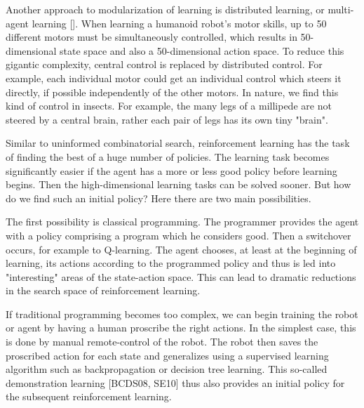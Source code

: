 \documentclass[10pt]{book}
\begin{document}
Another approach to modularization of learning is distributed learning, or multi-agent learning [\cite{panait2005cooperative}]. When learning a humanoid robot's motor skills, up to 50 different motors must be simultaneously controlled, which results in 50-dimensional state space and also a 50-dimensional action space. To reduce this gigantic complexity, central control is replaced by distributed control. For example, each individual motor could get an individual control which steers it directly, if possible independently of the other motors. In nature, we find this kind of control in insects. For example, the many legs of a millipede are not steered by a central brain, rather each pair of legs has its own tiny "brain".

Similar to uninformed combinatorial search, reinforcement learning has the task of finding the best of a huge number of policies. The learning task becomes significantly easier if the agent has a more or less good policy before learning begins. Then the high-dimensional learning tasks can be solved sooner. But how do we find such an initial policy? Here there are two main possibilities.

The first possibility is classical programming. The programmer provides the agent with a policy comprising a program which he considers good. Then a switchover occurs, for example to Q-learning. The agent chooses, at least at the beginning of learning, its actions according to the programmed policy and thus is led into "interesting" areas of the state-action space. This can lead to dramatic reductions in the search space of reinforcement learning.

If traditional programming becomes too complex, we can begin training the robot or agent by having a human proscribe the right actions. In the simplest case, this is done by manual remote-control of the robot. The robot then saves the proscribed action for each state and generalizes using a supervised learning algorithm such as backpropagation or decision tree learning. This so-called demonstration learning [BCDS08, SE10] thus also provides an initial policy for the subsequent reinforcement learning.
\end{document}
